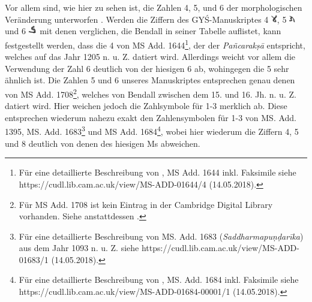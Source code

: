 \documentclass[a4paper,12pt]{article}
\begin{document}
{Vor allem sind, wie hier zu sehen ist, die Zahlen 4, 5, und 6 der morphologischen Veränderung unterworfen \parencite[liv]{bendall1992}. Werden die Ziffern des GYŚ-Manuskriptes 4 \includegraphics[height=4.0mm]{paleo_4.png}, 5 \includegraphics[height=4.0mm]{paleo_5.png} und 6 \includegraphics[height=4.0mm]{paleo_6.png} mit denen verglichen, die Bendall in seiner Tabelle \parencite[235]{bendall1992} auflistet, kann festgestellt werden, dass die 4 von MS Add. 1644\footnote{\raggedright{Für eine detaillierte Beschreibung von \textcite{pancaraksa2}, MS Add. 1644 inkl. Faksimile siehe https://cudl.lib.cam.ac.uk/view/MS-ADD-01644/4 (14.05.2018).}}, der der \textit{Pañcarakṣā} entspricht, welches auf das Jahr 1205 n. u. Z. datiert wird. Allerdings weicht vor allem die Verwendung der Zahl 6 deutlich von der hiesigen 6 ab, wohingegen die 5 sehr ähnlich ist. Die Zahlen 5 und 6 unseres Manuskriptes entsprechen genau denen von MS Add. 1708\footnote{Für MS Add. 1708 ist kein Eintrag in der Cambridge Digital Library vorhanden. Siehe anstattdessen \parencite[203]{bendall1992}.}, welches von Bendall zwischen dem 15. und 16. Jh. n. u. Z. datiert wird. Hier weichen jedoch die Zahlsymbole für 1-3 merklich ab. Diese entsprechen wiederum nahezu exakt den Zahlensymbolen für 1-3 von MS. Add. 1395, MS. Add. 1683\footnote{\raggedright{Für eine detaillierte Beschreibung von MS. Add. 1683 (\textit{Saddharmapuṇḍarīka}) aus dem Jahr 1093 n. u. Z. siehe https://cudl.lib.cam.ac.uk/view/MS-ADD-01683/1 (14.05.2018).}} und MS Add. 1684\footnote{\raggedright{Für eine detaillierte Beschreibung von \textcite{saddharma}, MS. Add. 1684 inkl. Faksimile siehe https://cudl.lib.cam.ac.uk/view/MS-ADD-01684-00001/1 (14.05.2018).}}, wobei hier wiederum die Ziffern 4, 5 und 8 deutlich von denen des hiesigen Ms abweichen.

}
\end{document}
